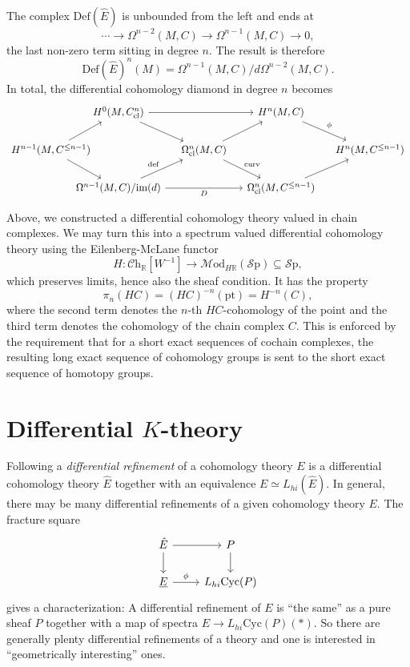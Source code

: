\documentclass[a4paper]{book}
\newcommand{\lC}{\mathcal{C}}
\newcommand{\lM}{\mathcal{M}}
\newcommand{\bR}{\mathbb{R}}
\newcommand{\lS}{\mathcal{S}}
\newcommand{\Sp}{\lS\mathrm{p}} %
\newcommand{\Ch}{\lC\mathrm{h}} %
\newcommand{\Mod}{\lM\mathrm{od}} %
\theoremstyle{definition}
\theoremstyle{remark}
\numberwithin{equation}{section}
\begin{document}
The complex $\mathrm{Def}(\hat{E})$ is unbounded from the left and ends at
\[
\cdots \longrightarrow \Omega^{n-2}(M, C) \longrightarrow \Omega^{n-1}(M, C) \longrightarrow 0,
\]
the last non-zero term sitting in degree $n$. The result is therefore
\[
\mathrm{Def}(\hat{E})^n(M) = \Omega^{n-1}(M, C)/d\Omega^{n-2}(M, C).
\]
In total, the differential cohomology diamond in degree $n$ becomes
\begin{equation*}
\begin{tikzcd}[column sep=0.4cm]
&[-1.2cm] 
H^0(M, C^n_{\mathrm{cl}})
\ar[dr]\ar[rr]
& & 
H^n(M, C) 
\ar[dr, "\phi"] 
&
\\ 	
H^{n-1}(M, C^{\leq n-1})
\ar[ur]
\ar[dr]
& & 
\Omega^n_{\mathrm{cl}}(M, C)  
\ar[ur]
\ar[dr, "\mathrm{curv}"]
& & 
H^n(M, C^{\leq n-1})
\\
& 
\Omega^{n-1}(M, C)/\mathrm{im}(d)
\ar[ur, "\mathrm{def}"]
\ar[rr, "D"']
& & 
\Omega^n_{\mathrm{cl}}(M, C^{\leq n-1}) 
\ar[ur]
&
\end{tikzcd}
\end{equation*}

Above, we constructed a differential cohomology theory valued in chain complexes. We may turn this into a spectrum valued differential cohomology theory using the Eilenberg-McLane functor
\[
H : \Ch_\bR[W^{-1}] \longrightarrow \Mod_{H\bR}(\Sp) \subseteq \Sp,
\]
which preserves limits, hence also the sheaf condition. It has the property
\[
\pi_n(HC) = (HC)^{-n}(\mathrm{pt}) = H^{-n}(C),
\]
where the second term denotes the $n$-th $HC$-cohomology of the point and the third term denotes the cohomology of the chain complex $C$. This is enforced by the requirement that for a short exact sequences of cochain complexes, the resulting long exact sequence of cohomology groups is sent to the short exact sequence of homotopy groups.

\section{Differential \texorpdfstring{$K$}{K}-theory}
Following \cite[Def.~3.6]{bunkenikolausvoelkl2016diffcoh} a \emph{differential refinement} of a  cohomology theory $E$ is a differential cohomology theory $\hat{E}$ together with an equivalence $E \simeq L_{hi}(\hat{E})$. In general, there may be many differential refinements of a given cohomology theory $E$. The fracture square
\[
\begin{tikzcd}
	\hat{E} \ar[d]\ar[r] & P
	\ar[d]
	\\
	\underline{E} \ar[r, "\phi"] &L_{hi}\mathrm{Cyc}(P)
\end{tikzcd}
\] 
gives a characterization: A differential refinement of $E$ is ``the same'' as a pure sheaf $P$ together with a map of spectra $E \to L_{hi}\mathrm{Cyc}(P)(*)$. So there are generally plenty differential refinements of a theory and one is interested in ``geometrically interesting'' ones.
\end{document}
